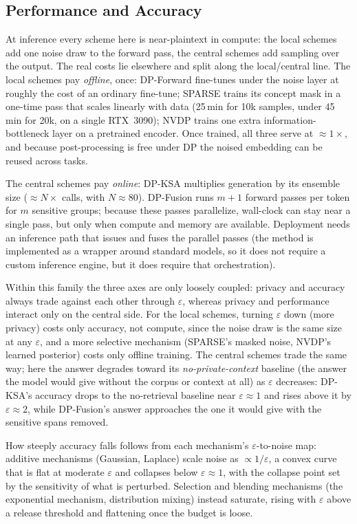 \subsection{Performance and Accuracy}
At inference every scheme here is near-plaintext in compute: the local schemes add one noise draw
to the forward pass, the central schemes add sampling over the output. The real costs lie elsewhere
and split along the local/central line. The local schemes pay \emph{offline}, once: DP-Forward
fine-tunes under the noise layer at roughly the cost of an ordinary fine-tune; SPARSE trains its concept mask in a one-time pass
that scales linearly with data (25\,min for 10k samples, under 45\,min for 20k, on a single
RTX~3090); NVDP trains one extra information-bottleneck layer on a pretrained encoder. Once trained,
all three serve at ${\approx}1\times$, and because post-processing is free under DP the noised
embedding can be reused across tasks.

The central schemes pay \emph{online}: DP-KSA multiplies
generation by its ensemble size (${\approx}N\times$ calls, with $N{\approx}80$). DP-Fusion runs
$m{+}1$ forward passes per token for $m$ sensitive groups; because these passes parallelize,
wall-clock can stay near a single pass, but only when compute and memory are available. Deployment needs an inference path
that issues and fuses the parallel passes (the method is implemented as a wrapper around standard
models, so it does not require a custom inference engine, but it does require that orchestration).

Within this family the three axes are only loosely coupled: privacy and accuracy always trade
against each other through $\varepsilon$, whereas privacy and performance interact only on the
central side. For the local schemes, turning $\varepsilon$ down (more privacy) costs only accuracy, not compute,
since the noise draw is the same size at any $\varepsilon$, and a more selective mechanism (SPARSE's
masked noise, NVDP's learned posterior) costs only offline training. The central schemes trade the
same way; here the answer degrades toward its \emph{no-private-context} baseline (the answer the
model would give without the corpus or context at all) as $\varepsilon$ decreases: DP-KSA's accuracy
drops to the no-retrieval baseline near $\varepsilon{\approx}1$ and rises above it by
$\varepsilon{\approx}2$, while DP-Fusion's answer approaches the one it would give with the sensitive
spans removed.

How steeply accuracy falls follows from
each mechanism's $\varepsilon$-to-noise map: additive mechanisms (Gaussian, Laplace) scale noise as
${\propto}1/\varepsilon$, a convex curve that is flat at moderate $\varepsilon$ and collapses below
$\varepsilon{\approx}1$, with the collapse point set by the sensitivity of what is perturbed.
Selection and blending mechanisms (the exponential mechanism, distribution mixing) instead saturate,
rising with $\varepsilon$ above a release threshold and flattening once the budget is loose.

